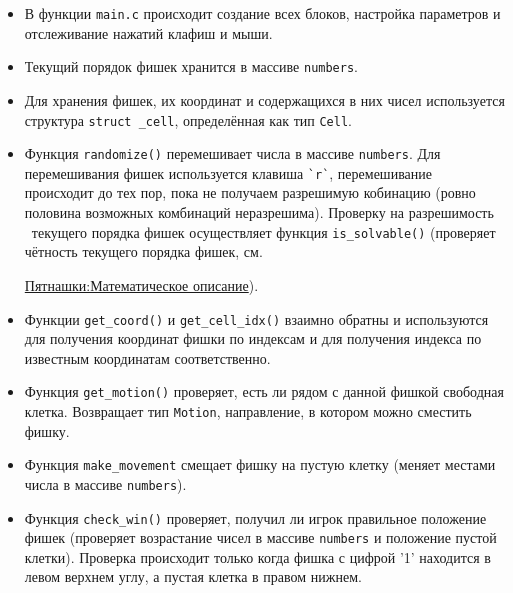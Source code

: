 \documentclass[fleqn]{article}
\begin{document}
\begin{itemize}
		\item В функции \verb|main.c| происходит создание всех блоков,
				настройка параметров и отслеживание нажатий клафиш и мыши.

		\item Текущий порядок фишек хранится в массиве \verb+numbers+.

		\item Для хранения фишек, их координат и содержащихся в них чисел
				используется структура \verb|struct _cell|, определённая как тип
				\verb+Cell+.

		\item Функция \verb+randomize()+ перемешивает числа в массиве
				\verb+numbers+. Для перемешивания фишек используется
				клавиша \verb+`r`+, перемешивание происходит до тех пор,
				пока не получаем разрешимую кобинацию (ровно половина
				возможных комбинаций неразрешима). Проверку на разрешимость \
				текущего порядка фишек осуществляет функция \verb+is_solvable()+
				(проверяет чётность текущего порядка фишек, см. 

				\href{https://ru.wikipedia.org/wiki/%D0%98%D0%B3%D1%80%D0%B0_%D0%B2_15#%D0%9C%D0%B0%D1%82%D0%B5%D0%BC%D0%B0%D1%82%D0%B8%D1%87%D0%B5%D1%81%D0%BA%D0%BE%D0%B5_%D0%BE%D0%BF%D0%B8%D1%81%D0%B0%D0%BD%D0%B8%D0%B5}{Пятнашки:Математическое описание}).

		\item Функции \verb|get_coord()| и \verb|get_cell_idx()| взаимно обратны
				и используются для получения координат фишки по индексам
				и для получения индекса по известным координатам соответственно.

		\item Функция \verb|get_motion()| проверяет, есть ли рядом с данной
				фишкой свободная клетка. Возвращает тип \verb|Motion|, 
				направление, в котором можно сместить фишку.

		\item Функция \verb|make_movement| смещает фишку на пустую клетку
				(меняет местами числа в массиве \verb|numbers|).

		\item Функция \verb|check_win()| проверяет, получил ли игрок
				правильное положение фишек (проверяет возрастание чисел
				в массиве \verb|numbers| и положение пустой клетки).
				Проверка происходит только когда фишка с цифрой '1' 
				находится в левом верхнем углу, а пустая клетка в правом нижнем.

\end{itemize}
\end{document}
